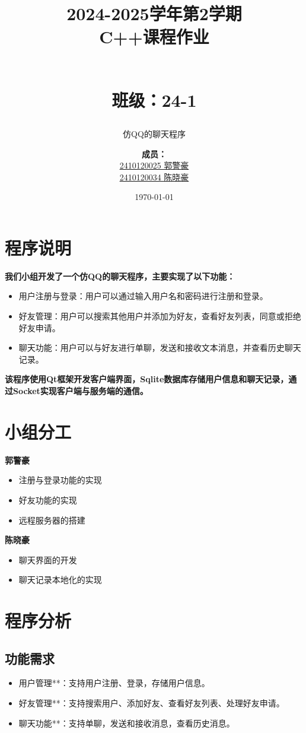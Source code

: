 \documentclass[UTF8]{ctexart}
\title{\textbf{2024-2025学年第2学期}\\ \textbf{C++课程作业}\\ \subtitle{仿QQ的聊天程序} \\ \small 班级：24-1} %
\author{\textbf{成员：}\\ \underline{2410120025 郭警豪} \\ \underline{2410120034 陈晓豪}
}
\date{\today}
\begin{document}
\maketitle
\tableofcontents
\newpage

\section{程序说明}

\RaggedRight %
\textbf{我们小组开发了一个仿QQ的聊天程序，主要实现了以下功能：}
\begin{itemize}
	\item 用户注册与登录：用户可以通过输入用户名和密码进行注册和登录。
	\item 好友管理：用户可以搜索其他用户并添加为好友，查看好友列表，同意或拒绝好友申请。
	\item 聊天功能：用户可以与好友进行单聊，发送和接收文本消息，并查看历史聊天记录。
\end{itemize}
\textbf{该程序使用Qt框架开发客户端界面，Sqlite数据库存储用户信息和聊天记录，通过Socket实现客户端与服务端的通信。}

\section{小组分工}
\textbf{郭警豪}
\begin{itemize}
	\item 注册与登录功能的实现
	\item 好友功能的实现
	\item 远程服务器的搭建
\end{itemize}
 \textbf{陈晓豪}
\begin{itemize}
	\item 聊天界面的开发
	\item 聊天记录本地化的实现
\end{itemize}
	

\section{程序分析}
\subsection{功能需求}
\begin{itemize}
	\item 用户管理**：支持用户注册、登录，存储用户信息。
	\item 好友管理**：支持搜索用户、添加好友、查看好友列表、处理好友申请。
	\item 聊天功能**：支持单聊，发送和接收消息，查看历史消息。
\end{itemize}	
\end{document}
